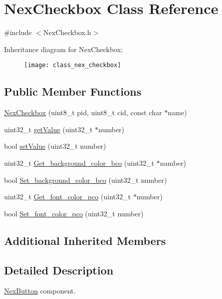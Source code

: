 \hypertarget{class_nex_checkbox}{\section{Nex\+Checkbox Class Reference}
\label{class_nex_checkbox}
}


{\ttfamily \#include $<$Nex\+Checkbox.\+h$>$}

Inheritance diagram for Nex\+Checkbox\+:\begin{figure}[H]
\begin{center}
\leavevmode
\texttt{[image: class\_nex\_checkbox]}
\end{center}
\end{figure}
\subsection*{Public Member Functions}
\begin{DoxyCompactItemize}
\item 
\hyperlink{class_nex_checkbox_a8aa4ea60796bdce0de0de3dd675ef56a}{Nex\+Checkbox} (uint8\+\_\+t pid, uint8\+\_\+t cid, const char $\ast$name)
\item 
uint32\+\_\+t \hyperlink{class_nex_checkbox_a6832110a49f9bbbb14a54f36db020d44}{get\+Value} (uint32\+\_\+t $\ast$number)
\item 
bool \hyperlink{class_nex_checkbox_aa932e7c45765400618dce1804766264b}{set\+Value} (uint32\+\_\+t number)
\item 
uint32\+\_\+t \hyperlink{class_nex_checkbox_abca30f46ecb7a4c88d816af85fa7f777}{Get\+\_\+background\+\_\+color\+\_\+bco} (uint32\+\_\+t $\ast$number)
\item 
bool \hyperlink{class_nex_checkbox_ab430ba5908c84fea8ab910002581350a}{Set\+\_\+background\+\_\+color\+\_\+bco} (uint32\+\_\+t number)
\item 
uint32\+\_\+t \hyperlink{class_nex_checkbox_a93fbcf8796f156e6700ebf3e13abfce6}{Get\+\_\+font\+\_\+color\+\_\+pco} (uint32\+\_\+t $\ast$number)
\item 
bool \hyperlink{class_nex_checkbox_aa1d52cc0170f11ec85263770fe77db2a}{Set\+\_\+font\+\_\+color\+\_\+pco} (uint32\+\_\+t number)
\end{DoxyCompactItemize}
\subsection*{Additional Inherited Members}


\subsection{Detailed Description}
\hyperlink{class_nex_button}{Nex\+Button} component.

